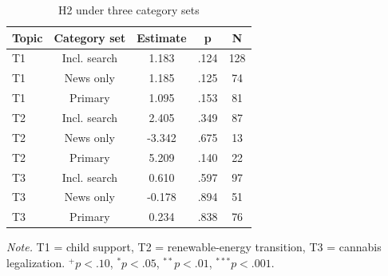 \begin{table}[htbp]
\centering
\begin{threeparttable}
\caption{H2 under three category sets}
\label{tab:tab_sens_category_set}
\begin{tabular}{lcccc}
\toprule
  Topic & Category set & Estimate & p & N \\
\midrule
  T1 & Incl. search & 1.183 & .124 & 128 \\
  T1 & News only & 1.185 & .125 & 74 \\
  T1 & Primary & 1.095 & .153 & 81 \\
  T2 & Incl. search & 2.405 & .349 & 87 \\
  T2 & News only & -3.342 & .675 & 13 \\
  T2 & Primary & 5.209 & .140 & 22 \\
  T3 & Incl. search & 0.610 & .597 & 97 \\
  T3 & News only & -0.178 & .894 & 51 \\
  T3 & Primary & 0.234 & .838 & 76 \\
\bottomrule
\end{tabular}
\begin{tablenotes}\footnotesize\item \textit{Note.} T1 = child support, T2 = renewable-energy transition, T3 = cannabis legalization. $^{+}p<.10$, $^{*}p<.05$, $^{**}p<.01$, $^{***}p<.001$.\end{tablenotes}
\end{threeparttable}
\end{table}
